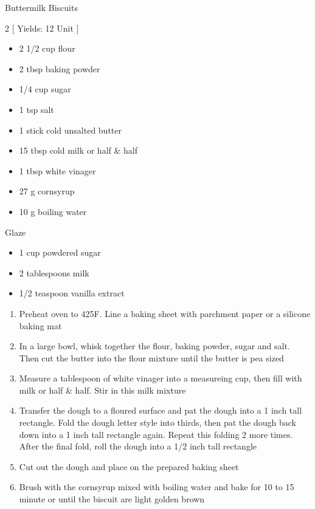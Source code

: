 \begin{Large}
    Buttermilk Biscuits
\end{Large}

\begin{scriptsize}
\begin{multicols}{2}
[
\vspace{1em}
Yields: 12 Unit
\vspace{-1.5em}
]

\begin{itemize}
    \item 2 1/2 cup flour
    \item 2 tbsp baking powder
    \item 1/4 cup sugar
    \item 1 tsp salt
    \item 1 stick cold unsalted butter
    \item 15 tbsp cold milk or half \& half
    \item 1 tbsp white vinager
    \item 27 g cornsyrup
    \item 10 g boiling water
\end{itemize}

Glaze
\begin{itemize}
    \item 1 cup powdered sugar
    \item 2 tablespoons milk
    \item 1/2 teaspoon vanilla extract
\end{itemize}
\end{multicols}
\end{scriptsize}

\begin{footnotesize}
\begin{enumerate}
    \item Preheat oven to 425\degree F. Line a baking sheet with parchment paper or a silicone baking mat
    \item In a large bowl, whisk together the flour, baking powder, sugar and salt. Then cut the butter into the flour mixture until the butter is pea sized
    \item Measure a tablespoon of white vinager into a measureing cup, then fill with milk or half \& half. Stir in this milk mixture
    \item Transfer the dough to a floured surface and pat the dough into a 1 inch tall rectangle. Fold the dough letter style into thirds, then pat the dough back down into a 1 inch tall rectangle again. Repeat this folding 2 more times. After the final fold, roll the dough into a 1/2 inch tall rectangle
    \item Cut out the dough and place on the prepared baking sheet
    \item Brush with the cornsyrup mixed with boiling water and bake for 10 to 15 minute or until the biscuit are light golden brown
\end{enumerate}
\end{footnotesize}

\vspace{2em}
